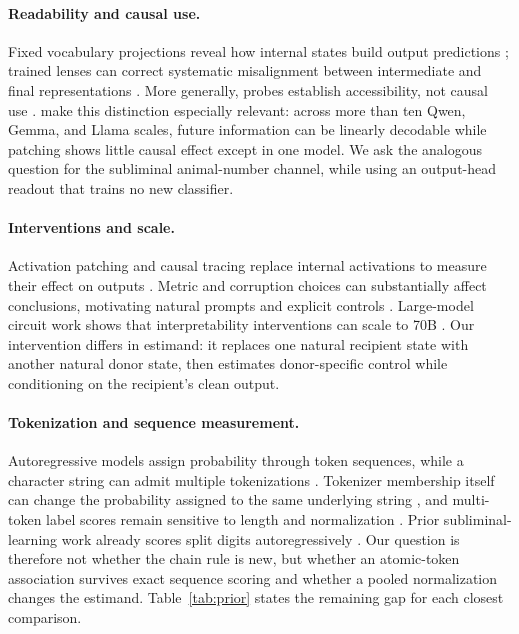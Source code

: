 \documentclass[letterpaper]{article}
\begin{document}
\paragraph{Readability and causal use.}
Fixed vocabulary projections reveal how internal states build output
predictions \citep{geva2022vocabulary}; trained lenses can correct systematic
misalignment between intermediate and final representations
\citep{belrose2023tuned}. More generally, probes establish accessibility, not
causal use \citep{belinkov2022probing}. \citet{ma2026plan} make this distinction
especially relevant: across more than ten Qwen, Gemma, and Llama scales, future
information can be linearly decodable while patching shows little causal effect
except in one model. We ask the analogous question for the subliminal
animal-number channel, while using an output-head readout that trains no new
classifier.

\paragraph{Interventions and scale.}
Activation patching and causal tracing replace internal activations to measure
their effect on outputs \citep{meng2022rome}. Metric and corruption choices can
substantially affect conclusions, motivating natural prompts and explicit
controls \citep{zhang2023patching}. Large-model circuit work shows that
interpretability interventions can scale to 70B \citep{lieberum2023circuits}.
Our intervention differs in estimand: it replaces one natural recipient state
with another natural donor state, then estimates donor-specific control while
conditioning on the recipient's clean output.

\paragraph{Tokenization and sequence measurement.}
Autoregressive models assign probability through token sequences, while a
character string can admit multiple tokenizations \citep{geh2024tokenization}.
Tokenizer membership itself can change the probability assigned to the same
underlying string \citep{lesci2025tokenisation}, and multi-token label scores
remain sensitive to length and normalization \citep{sanz2025length}. Prior
subliminal-learning work already scores split digits autoregressively
\citep{schrodi2026understanding}. Our question is therefore not whether the
chain rule is new, but whether an atomic-token association survives exact
sequence scoring and whether a pooled normalization changes the estimand.
Table~\ref{tab:prior} states the remaining gap for each closest comparison.
\end{document}
